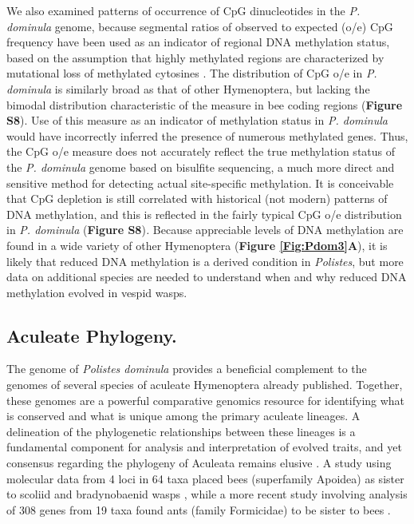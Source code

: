 We also examined patterns of occurrence of CpG dinucleotides in the
\textit{P. dominula} genome, because segmental ratios of observed to
expected (o/e) CpG frequency have been used as an indicator of regional
DNA methylation status, based on the assumption that highly methylated
regions are characterized by mutational loss of methylated cytosines
\cite{Yi2009}. The
distribution of CpG o/e in \textit{P. dominula} is similarly broad as that
of other Hymenoptera, but lacking the bimodal distribution
characteristic of the measure in bee coding regions (\textbf{Figure
S8}). Use of this measure as an indicator of methylation status in
\textit{P. dominula} would have incorrectly inferred the presence of
numerous methylated genes. Thus, the CpG o/e measure does not accurately
reflect the true methylation status of the \textit{P. dominula} genome
based on bisulfite sequencing, a much more direct and sensitive method
for detecting actual site-specific methylation. It is conceivable that
CpG depletion is still correlated with historical (not modern) patterns
of DNA methylation, and this is reflected in the fairly typical CpG o/e
distribution in \textit{P. dominula} (\textbf{Figure S8})\textit{.} Because
appreciable levels of DNA methylation are found in a wide variety of
other Hymenoptera (\textbf{Figure \ref{Fig:Pdom3}A}), it is likely that reduced DNA
methylation is a derived condition in \textit{Polistes}, but more data on
additional species are needed to understand when and why reduced DNA
methylation evolved in vespid wasps.

\subsection{Aculeate Phylogeny.} The genome of \textit{Polistes dominula}
provides a beneficial complement to the genomes of several species of
aculeate Hymenoptera already published. Together, these genomes are a
powerful comparative genomics resource for identifying what is conserved
and what is unique among the primary aculeate lineages. A delineation of
the phylogenetic relationships between these lineages is a fundamental
component for analysis and interpretation of evolved traits, and yet
consensus regarding the phylogeny of Aculeata remains elusive \cite{JohnsonPhylo,Pilgrim20008}. A
study using molecular data from 4 loci in 64 taxa placed bees
(superfamily Apoidea) as sister to scoliid and bradynobaenid wasps \cite{Pilgrim2008}, while
a more recent study involving analysis of 308 genes from 19 taxa found
ants (family Formicidae) to be sister to bees \cite{JohnsonPhylo}.

